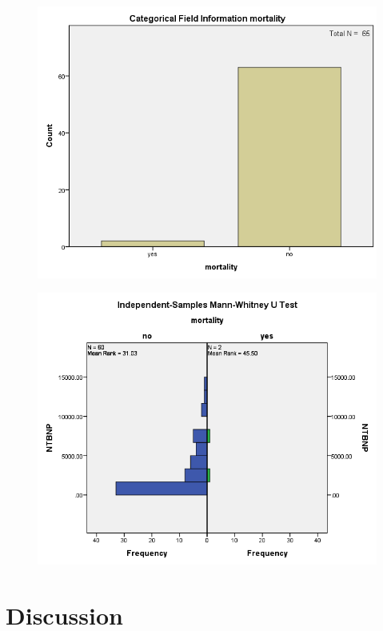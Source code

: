 \documentclass[14pt,a4paper,onecolumn]{extarticle}
\begin{document}
\clearpage
\begin{figure}
    \centering
    \includegraphics[scale=0.7]{./images/cat_mort.png}
    \caption{}
    \label{}
\end{figure}

\clearpage
\begin{figure}
    \centering
    \includegraphics[scale=0.7]{./images/manwhit_mort.png}
    \caption{}
    \label{}
\end{figure}

\clearpage
\section{Discussion}
\end{document}
